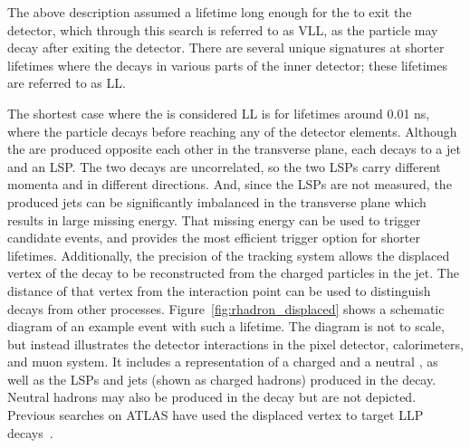The above description assumed a lifetime long enough for the \rhadron to exit the detector, which through this search is referred to as \ac{VLL}, as the particle may decay after exiting the detector.
There are several unique signatures at shorter lifetimes where the \rhadron decays in various parts of the inner detector; these lifetimes are referred to as \ac{LL}.

The shortest case where the \rhadron is considered \ac{LL} is for lifetimes around 0.01 ns, where the particle decays before reaching any of the detector elements.
Although the \rhadrons are produced opposite each other in the transverse plane, each \rhadron decays to a jet and an \ac{LSP}.
The two decays are uncorrelated, so the two \acp{LSP} carry different momenta and in different directions. 
And, since the \acp{LSP} are not measured, the produced jets can be significantly imbalanced in the transverse plane which results in large missing energy.
That missing energy can be used to trigger candidate events, and provides the most efficient trigger option for shorter lifetimes.
Additionally, the precision of the tracking system allows the displaced vertex of the \rhadron decay to be reconstructed from the charged particles in the jet.
The distance of that vertex from the interaction point can be used to distinguish \rhadron decays from other processes.
Figure~\ref{fig:rhadron_displaced} shows a schematic diagram of an example \rhadron event with such a lifetime.
The diagram is not to scale, but instead illustrates the detector interactions in the pixel detector, calorimeters, and muon system.
It includes a representation of a charged \rhadron and a neutral \rhadron, as well as the \acp{LSP} and jets (shown as charged hadrons) produced in the decay.
Neutral hadrons may also be produced in the decay but are not depicted.
Previous searches on ATLAS have used the displaced vertex to target \ac{LLP} decays~\cite{SUSY-2014-02}.


